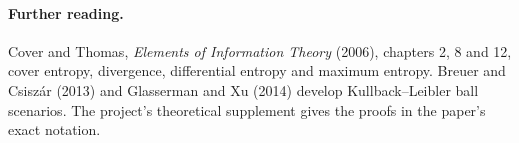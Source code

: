 \documentclass[11pt]{article}
\theoremstyle{plain}
\theoremstyle{definition}
\theoremstyle{remark}
\begin{document}
\paragraph{Further reading.} Cover and Thomas, \emph{Elements of Information
Theory} (2006), chapters 2, 8 and 12, cover entropy, divergence, differential
entropy and maximum entropy. Breuer and Csiszár (2013) and Glasserman and Xu
(2014) develop Kullback--Leibler ball scenarios. The project's theoretical
supplement gives the proofs in the paper's exact notation.
\end{document}
